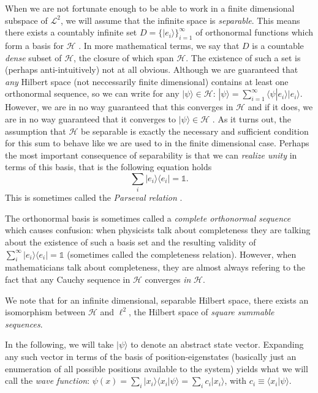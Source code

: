 \documentclass[../../master.tex]{subfiles}
\begin{document}
When we are not fortunate enough to be able to work in a finite dimensional subspace of $\mathcal{L}^2$, we will assume that the infinite space is \emph{separable}. This means there exists a countably infinite set $D=\{|e_i\rangle\}_{i=1}^\infty$ of orthonormal functions which form a basis for $\mathcal{H}$ \cite{fys4110}. In more mathematical terms, we say that $D$ is a countable \emph{dense} subset of $\mathcal H$, the closure of which span $\mathcal{H}$. The existence of such a set is (perhaps anti-intuitively)  not at all obvious. Although we are guaranteed that \emph{any} Hilbert space (not neccessarily finite dimensional) contains at least one orthonormal sequence, so we can write for any $|\psi\rangle \in \mathcal H$: $|\psi\rangle = \sum_{i=1}^\infty \langle \psi|e_i\rangle |e_i\rangle$. However, we are in no way guaranteed that this converges in $\mathcal{H}$ and if it does, we are in no way guaranteed that it converges to $|\psi\rangle\in \mathcal H$ \cite{rynne}. As it turns out, the assumption that $\mathcal H$ be separable is exactly the necessary and sufficient condition for this sum to behave like we are used to in the finite dimensional case. Perhaps the most important consequence of separability is that we can \emph{realize unity} in terms of this basis, that is the following equation holds \cite{hassani}$$\sum_i |e_i\rangle \langle e_i|=\mathds{1}.$$ This is sometimes called the \emph{Parseval relation} \cite{rynne}.

The orthonormal basis is sometimes called a \emph{complete orthonormal sequence} \cite{rynne} which causes confusion: when physicists talk about completeness they are talking about the existence of such a basis set and the resulting validity of $\sum_i^\infty |e_i\rangle\langle e_i|=\mathds{1}$ (sometimes called the completeness relation). However, when mathematicians talk about completeness, they are almost always refering to the fact that any Cauchy sequence in $\mathcal{H}$ converges \emph{in} $\mathcal{H}$.

We note that for an infinite dimensional, separable Hilbert space, there exists an isomorphism between $\mathcal H$ and $\ell^2$, the Hilbert space of \emph{square summable sequences}. 

In the following, we will take $|\psi\rangle$ to denote an abstract state vector. Expanding any such vector in terms of  the basis of position-eigenstates (basically just an enumeration of all possible positions available to the system) yields what we will call the \emph{wave function}: $\psi(x)=\sum_i|x_i\rangle  \langle x_i | \psi \rangle = \sum_i c_i |x_i\rangle$, with $c_i\equiv \langle x_i|\psi\rangle$.
\end{document}
